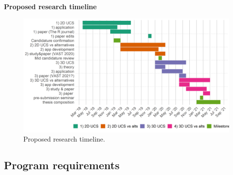\documentclass[
  11,
]{article}
\begin{document}
\textbf{Proposed research timeline}

\begin{figure}[h]

{\centering \includegraphics[width=1\linewidth,]{figures/phd_timeline} 

}

\caption{Proposed research timeline.}\label{fig:timeline}
\end{figure}

\hypertarget{program-requirements}{%
\subsection{Program requirements}\label{program-requirements}}
\end{document}
